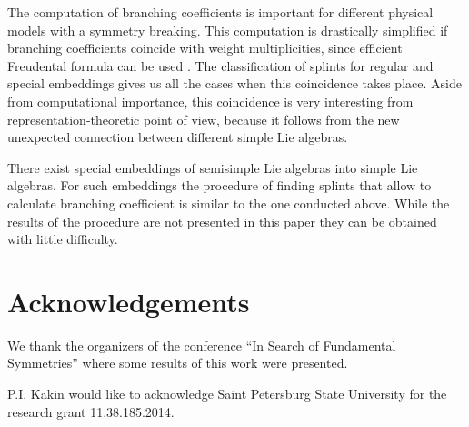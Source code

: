 \documentclass[12pt]{article}
\begin{document}
The computation of branching coefficients is important for different physical models with a symmetry
breaking. This computation is drastically simplified if branching coefficients coincide with weight
multiplicities, since efficient Freudental formula can be used \cite{moody1982fast}. The classification
of splints for regular and special embeddings gives us all the cases when this coincidence takes
place. Aside from computational importance, this coincidence is very interesting from
representation-theoretic point of view, because it follows from the new unexpected connection between
different simple Lie algebras. 

There exist special embeddings of semisimple Lie algebras into simple Lie algebras. For such
embeddings the procedure of finding splints that allow to calculate branching coefficient is similar
to the one conducted above. While the results of the procedure are not presented in this paper they
can be obtained with little difficulty.

\section*{Acknowledgements}
\label{sec:acknowledgements}

We thank the organizers of the conference ``In Search of Fundamental Symmetries'' where some results
of this work were presented.

P.I. Kakin would like to acknowledge Saint Petersburg State University for the research grant
11.38.185.2014.


{} 

\end{document}
